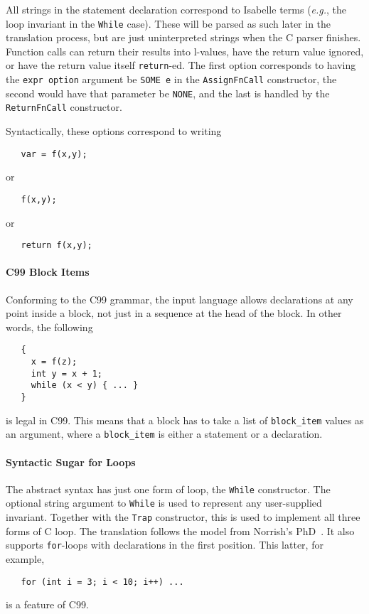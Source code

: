 \documentclass{article}
\newcommand{\strictc}{\textsf{StrictC}}
\newcommand{\eg}{\textit{e.g.}}
\begin{document}
All strings in the statement declaration correspond to Isabelle terms
(\eg, the loop invariant in the \texttt{While} case).
These will be parsed as such later in the translation
process, but are just uninterpreted strings when the C parser
finishes.
Function calls can return their results into l-values, have the return
value ignored, or have the return value itself \texttt{return}-ed.
The first option corresponds to having the \texttt{expr~option} argument
be \texttt{SOME~e} in the \texttt{AssignFnCall} constructor, the second
would have that parameter be \texttt{NONE}, and the last is handled by
the \texttt{ReturnFnCall} constructor.

Syntactically, these options correspond to writing
\begin{verbatim}
   var = f(x,y);
\end{verbatim}
or
\begin{verbatim}
   f(x,y);
\end{verbatim}
or
\begin{verbatim}
   return f(x,y);
\end{verbatim}

\paragraph{C99 Block Items}
Conforming to the C99 grammar, the input language allows declarations
at any point inside a block, not just in a sequence at the head of the
block.  In other words, the following
\begin{verbatim}
   {
     x = f(z);
     int y = x + 1;
     while (x < y) { ... }
   }
\end{verbatim}
is legal in C99.  This means that a block has
to take a list of \texttt{block_item} values as an argument, where a
\texttt{block_item} is either a statement or a declaration.

\paragraph{Syntactic Sugar for Loops}
The abstract syntax has just one form of loop, the \texttt{While}
constructor.  The optional string argument to \texttt{While} is used
to represent any user-supplied invariant.  Together with the
\texttt{Trap} constructor, this is used to implement all three forms
of C loop.  The translation follows the model from Norrish's
PhD~\cite[p60]{norrish98}.  It also supports \texttt{for}-loops with
declarations in the first position.  This latter, for example,
\begin{verbatim}
   for (int i = 3; i < 10; i++) ...
\end{verbatim}
is a feature of C99.
\end{document}
